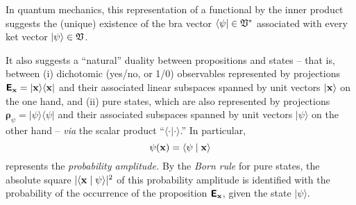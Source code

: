 {\color{Purple}
In quantum mechanics,
this representation of a functional by the inner product suggests
the (unique) existence of
the bra vector $\langle \psi \vert \in {\frak V}^\ast $
associated with every ket vector $\vert \psi \rangle \in {\frak V}$.

It also suggests a ``natural'' duality between
propositions and states
--
that is, between (i)
dichotomic (yes/no, or 1/0) observables
represented by projections $\textsf{\textbf{E}}_{\bf x}= \vert {\bf x} \rangle \langle {\bf x} \vert$
and their associated linear subspaces  spanned by unit vectors  $\vert {\bf x} \rangle $
on the one hand,
and (ii) pure states, which are also represented by projections $\boldsymbol{\rho}_{\psi}= \vert \psi \rangle \langle \psi \vert$
and their associated subspaces spanned by unit vectors  $ \vert {\psi} \rangle$
on the other hand
--
{\em via} the scalar product ``$\langle \cdot \vert \cdot \rangle$.''
In particular,\cite{hamhalter-book}
\begin{equation}
{{\psi}} ({\bf x})  = \langle \psi \mid  {\bf x} \rangle
\end{equation}
represents the {\em probability amplitude.}
By the {\em Born rule}
for pure states,
the absolute square $\vert \langle {\bf x} \mid \psi \rangle \vert^2$
of this probability amplitude is identified with the probability of the occurrence of the proposition
$\textsf{\textbf{E}}_{\bf x}$,
given the state  $ \vert {\psi} \rangle$.

}
